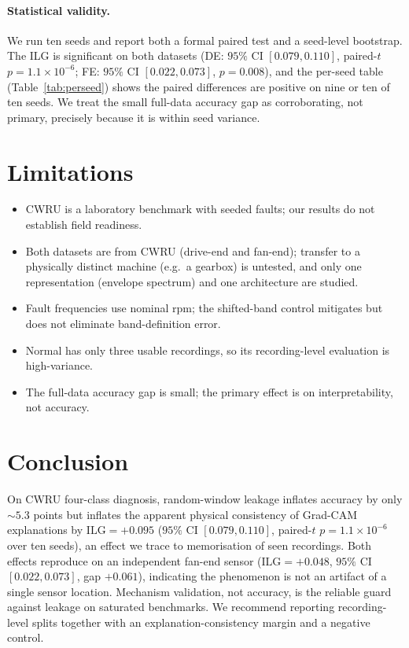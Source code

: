 \documentclass[11pt]{article}
\begin{document}
\paragraph{Statistical validity.}
We run ten seeds and report both a formal paired test and a seed-level bootstrap. The ILG
is significant on both datasets (DE: $95\%$ CI $[0.079,0.110]$, paired-$t$
$p=1.1\times10^{-6}$; FE: $95\%$ CI $[0.022,0.073]$, $p=0.008$), and the per-seed table
(Table~\ref{tab:perseed}) shows the paired differences are positive on nine or ten of ten
seeds. We treat the small full-data accuracy gap as corroborating, not primary,
precisely because it is within seed variance.

\section{Limitations}
\begin{itemize}
  \item CWRU is a laboratory benchmark with seeded faults; our results do not establish
  field readiness.
  \item Both datasets are from CWRU (drive-end and fan-end); transfer to a physically
  distinct machine (e.g.\ a gearbox) is untested, and only one representation (envelope
  spectrum) and one architecture are studied.
  \item Fault frequencies use nominal rpm; the shifted-band control mitigates but does not
  eliminate band-definition error.
  \item Normal has only three usable recordings, so its recording-level evaluation is
  high-variance.
  \item The full-data accuracy gap is small; the primary effect is on interpretability,
  not accuracy.
\end{itemize}

\section{Conclusion}
On CWRU four-class diagnosis, random-window leakage inflates accuracy by only
$\sim5.3$ points but inflates the apparent physical consistency of Grad-CAM explanations
by $\mathrm{ILG}=+0.095$ ($95\%$ CI $[0.079,0.110]$, paired-$t$ $p=1.1\times10^{-6}$ over
ten seeds), an effect we trace to memorisation of seen recordings. Both effects reproduce
on an independent fan-end sensor ($\mathrm{ILG}=+0.048$, $95\%$ CI $[0.022,0.073]$, gap
$+0.061$), indicating the phenomenon is not an artifact of a single sensor location.
Mechanism
validation, not accuracy, is the reliable guard against leakage on saturated benchmarks.
We recommend reporting recording-level splits together with an explanation-consistency
margin and a negative control.
\end{document}
